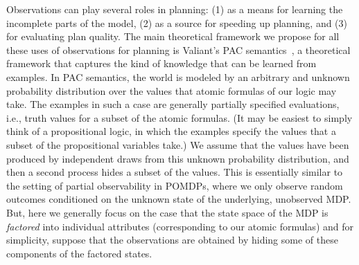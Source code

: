 \documentclass[12pt]{article}
\begin{document}
Observations can play several roles in planning: (1) as a means for learning the incomplete parts of the model, (2) as a source for speeding up planning, and (3) for evaluating plan quality. 
The main theoretical framework we propose for all these uses of observations for planning is Valiant's PAC semantics~\cite{valiant2000robustLogics}, a theoretical framework that captures the kind of knowledge that can be learned from examples. 
In PAC semantics, the world is modeled by an arbitrary and unknown probability distribution over the values that atomic formulas of our logic may take. The examples in such a case are generally partially specified evaluations, i.e., truth values for a subset of the atomic formulas. (It may be easiest to simply think of a propositional logic, in which the examples specify the values that a subset of the propositional variables take.) We assume that the values have been produced by independent draws from this unknown probability distribution, and then a second process hides a subset of the values. This is essentially similar to the setting of partial observability in POMDPs, where we only observe random outcomes conditioned on the unknown state of the underlying, unobserved MDP. But, here we generally focus on the case that the state space of the MDP is {\em factored} into individual attributes (corresponding to our atomic formulas) and for simplicity, suppose that the observations are obtained by hiding some of these components of the factored states.
\end{document}
